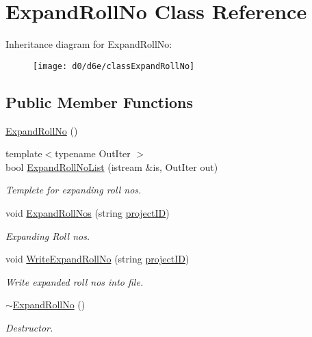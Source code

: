 \hypertarget{classExpandRollNo}{\section{Expand\-Roll\-No Class Reference}
\label{classExpandRollNo}
}
Inheritance diagram for Expand\-Roll\-No\-:\begin{figure}[H]
\begin{center}
\leavevmode
\texttt{[image: d0/d6e/classExpandRollNo]}
\end{center}
\end{figure}
\subsection*{Public Member Functions}
\begin{DoxyCompactItemize}
\item 
\hyperlink{classExpandRollNo_a60e3a3d50ebe826b6d5c3304757812ca}{Expand\-Roll\-No} ()
\item 
{\footnotesize template$<$typename Out\-Iter $>$ }\\bool \hyperlink{classExpandRollNo_afcb476d9d9f1fdabd456f3ec84b14184}{Expand\-Roll\-No\-List} (istream \&is, Out\-Iter out)
\begin{DoxyCompactList}\small\item\em Templete for expanding roll nos. \end{DoxyCompactList}\item 
void \hyperlink{classExpandRollNo_a4917831a98da9aa068b2589945b46065}{Expand\-Roll\-Nos} (string \hyperlink{classReadInput_a3ad470a25b3e0a29466bf4ff1f7d8e81}{project\-I\-D})
\begin{DoxyCompactList}\small\item\em Expanding Roll nos. \end{DoxyCompactList}\item 
void \hyperlink{classExpandRollNo_af95bc4c35354c225bdfff5fae7f6b845}{Write\-Expand\-Roll\-No} (string \hyperlink{classReadInput_a3ad470a25b3e0a29466bf4ff1f7d8e81}{project\-I\-D})
\begin{DoxyCompactList}\small\item\em Write expanded roll nos into file. \end{DoxyCompactList}\item 
\hyperlink{classExpandRollNo_acf3cb7b789bd49a79672cb93dac2ed7c}{$\sim$\-Expand\-Roll\-No} ()
\begin{DoxyCompactList}\small\item\em Destructor. \end{DoxyCompactList}\end{DoxyCompactItemize}
